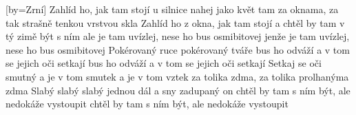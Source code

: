 [by={Zrní}]
\beginverse
Zahlíd ho, jak tam stojí
u silnice nahej jako květ
tam za oknama, za tak strašně tenkou vrstvou skla
\endverse
\beginverse
Zahlíd ho z okna, jak tam stojí
a chtěl by tam v tý zimě být s ním
ale je tam uvízlej, nese ho bus osmibitovej
jenže je tam uvízlej, nese ho bus osmibitovej
\endverse
\beginverse
Pokérovaný ruce
pokérovaný tváře
bus ho odváží a v tom se jejich oči setkají
bus ho odváží a v tom se jejich oči setkají 
\endverse
\beginverse
Setkaj se oči smutný
a je v tom smutek a je v tom vztek
za tolika zdma, za tolika prolhanýma zdma
\endverse
\beginverse
Slabý slabý slabý
jednou dál a sny zadupaný
on chtěl by tam s ním být, ale nedokáže vystoupit
chtěl by tam s ním být, ale nedokáže vystoupit 
\endverse
\endsong
